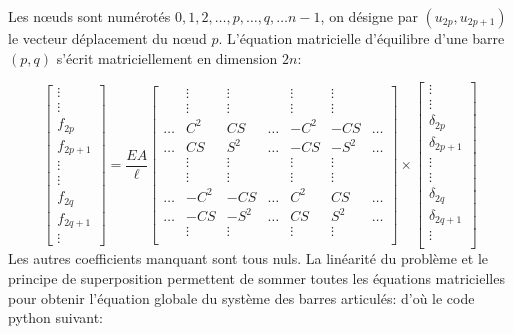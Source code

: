 \documentclass[a4paper]{article}
\begin{document}
Les nœuds sont numérotés $0,1,2,\dots ,p,\dots,q,\dots n-1$, on désigne par $(u_{2p},u_{2p+1})$ le vecteur déplacement du nœud $p$. L'équation matricielle d'équilibre d'une barre $(p,q)$ s'écrit matriciellement  en dimension $2n$:

\[
\begin{bmatrix}
  \vdots\\
 \vdots\\
     f_{2p} \\
    f_{2p+1} \\
   \vdots\\
     \vdots\\
     f_{2q} \\
     f_{2q+1} \\
     \vdots
\end{bmatrix}
=\frac{E A}{\ell} 
\begin{bmatrix}
        & \vdots & \vdots & & \vdots& \vdots&  \\
        & \vdots & \vdots & & \vdots& \vdots&  \\
     \dots      & C^2 & CS & \dots & -C^2& -CS& \dots \\
    \dots       & CS & S^2& \dots & -CS& -S^2& \dots\\
        & \vdots & \vdots & & \vdots& \vdots&  \\
        & \vdots & \vdots & & \vdots& \vdots&  \\
     \dots      & -C^2 & -CS & \dots & C^2& CS& \dots\\
      \dots      & -CS & -S^2 & \dots & CS& S^2& \dots\\
        & \vdots & \vdots & & \vdots& \vdots&  \\

\end{bmatrix}
\times
\begin{bmatrix}
  \vdots\\
 \vdots\\
     \delta_{2p} \\
    \delta_{2p+1} \\
   \vdots\\
     \vdots\\
     \delta_{2q} \\
     \delta_{2q+1} \\
     \vdots\\
\end{bmatrix}
\]
Les autres coefficients manquant sont tous nuls. La linéarité du problème et le principe de superposition permettent de sommer toutes les équations matricielles pour obtenir l'équation globale du système des barres articulés: d'où le code python suivant:
\end{document}
